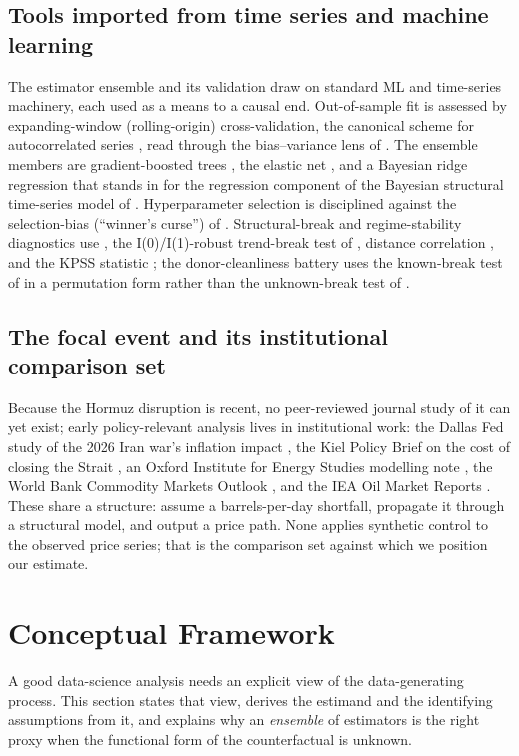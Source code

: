 \documentclass[11pt,a4paper]{article}
\begin{document}
\subsection{Tools imported from time series and machine learning}
The estimator ensemble and its validation draw on standard ML and time-series
machinery, each used as a means to a causal end. Out-of-sample fit is assessed by
expanding-window (rolling-origin) cross-validation, the canonical scheme for
autocorrelated series \citep{hyndman2018,bergmeir2012}, read through the
bias--variance lens of \citet{hastie2009}. The ensemble members are gradient-boosted
trees \citep{friedman2001,chenguestrin2016}, the elastic net \citep{zouhastie2005},
and a Bayesian ridge regression that stands in for the regression component of the
Bayesian structural time-series model of \citet{brodersen2015}. Hyperparameter
selection is disciplined against the selection-bias (``winner's curse'') of
\citet{cawley2010}. Structural-break and regime-stability diagnostics use
\citet{baiperron1998,baiperron2003}, the I(0)/I(1)-robust trend-break test of
\citet{harvey2009}, distance correlation \citep{szekely2007}, and the KPSS statistic
\citep{kpss1992}; the donor-cleanliness battery uses the known-break test of
\citet{chow1960} in a permutation form \citep{lehmannromano2005} rather than the
unknown-break test of \citet{andrews1993}.

\subsection{The focal event and its institutional comparison set}
Because the Hormuz disruption is recent, no peer-reviewed journal study of it can yet
exist; early policy-relevant analysis lives in institutional work: the Dallas Fed
study of the 2026 Iran war's inflation impact \citep{dallasfed2026}, the Kiel Policy
Brief on the cost of closing the Strait \citep{kiel2026}, an Oxford Institute for
Energy Studies modelling note \citep{oies2026}, the World Bank Commodity Markets
Outlook \citep{worldbank2026}, and the IEA Oil Market Reports \citep{iea2026}. These
share a structure: assume a barrels-per-day shortfall, propagate it through a
structural model, and output a price path. None applies synthetic control to the
observed price series; that is the comparison set against which we position our
estimate.

\section{Conceptual Framework}\label{sec:theory}
A good data-science analysis needs an explicit view of the data-generating process.
This section states that view, derives the estimand and the identifying assumptions
from it, and explains why an \emph{ensemble} of estimators is the right proxy when the
functional form of the counterfactual is unknown.
\end{document}
